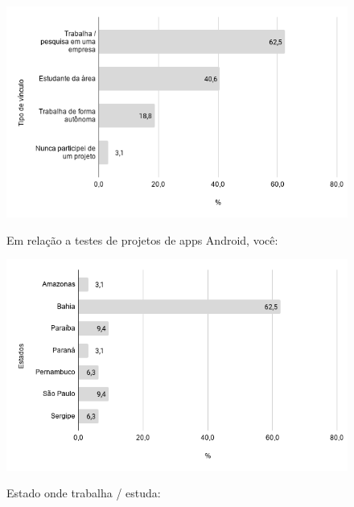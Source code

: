     
        \begin{figure}[!htb]
        \centering
        \includegraphics[width=.80\textwidth]{images/s_projetos.png}
        \label{figure:s_projetos}
        \caption{Em relação a testes de projetos de apps Android, você:}
        \end{figure}
    
    
        \begin{figure}[!htb]
        \centering
        \includegraphics[width=.80\textwidth]{images/s_estado.png}
        \label{figure:s_estado}
        \caption{Estado onde trabalha / estuda:}
        \end{figure}


